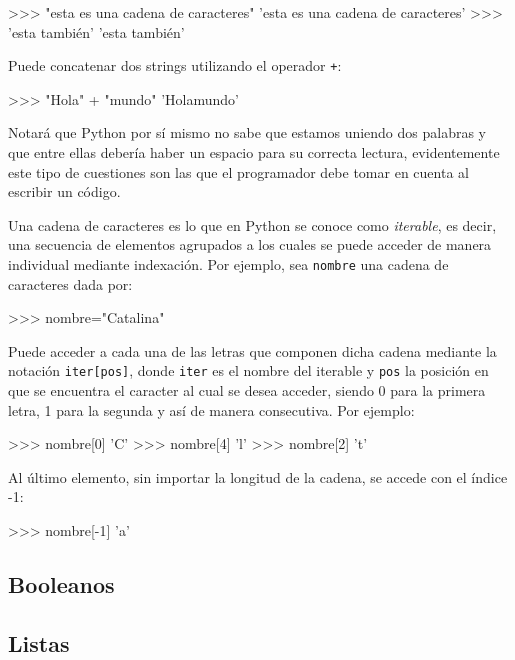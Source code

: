 \begin{python}
>>> "esta es una cadena de caracteres"
'esta es una cadena de caracteres'
>>> 'esta también'
'esta también'
\end{python}

Puede concatenar dos strings utilizando el operador \texttt{+}:

\begin{python}
>>> "Hola" + "mundo"
'Holamundo'
\end{python}

Notará que Python por sí mismo no sabe que estamos uniendo dos palabras y que entre ellas debería haber un espacio 
para su correcta lectura, evidentemente este tipo de cuestiones son las que el programador debe tomar en cuenta al 
escribir un código.

Una cadena de caracteres es lo que en Python se conoce como \textit{iterable}, es decir, una secuencia de 
elementos agrupados a los cuales se puede acceder de manera individual mediante indexación. Por ejemplo, 
sea \texttt{nombre} una cadena de caracteres dada por:

\begin{python}
>>> nombre="Catalina"
\end{python}

Puede acceder a cada una de las letras que componen dicha cadena mediante la notación \texttt{iter[pos]}, donde 
\texttt{iter} es el nombre del iterable y \texttt{pos} la posición en que se encuentra el caracter al cual 
se desea acceder, siendo 0 para la primera letra, 1 para la segunda y así de manera consecutiva. Por ejemplo: 

\begin{python}
>>> nombre[0]
'C'
>>> nombre[4]
'l'
>>> nombre[2]
't'
\end{python}

Al último elemento, sin importar la longitud de la cadena, se accede con el índice -1:

\begin{python}
>>> nombre[-1]
'a'
\end{python}


\subsection{Booleanos}



\subsection{Listas}

